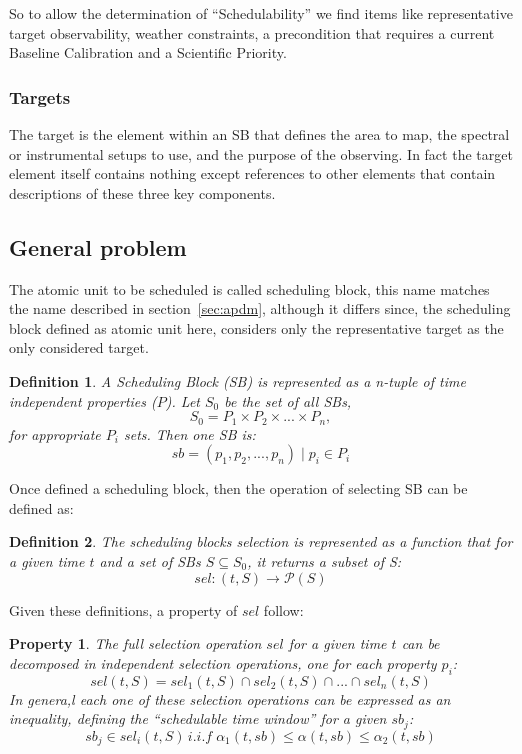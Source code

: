 \documentclass[11pt]{article}
\begin{document}
So to allow the determination of ``Schedulability'' we find items like representative target observability, weather constraints, a precondition that requires a current Baseline Calibration and a Scientific Priority.

\subsubsection*{Targets}
The target is the element within an SB that defines the area to map, the spectral or instrumental setups to use, and the purpose of the observing. In fact the target element itself contains nothing except references to other elements that contain descriptions of these three key components.

\subsection{General problem}
\newtheorem{problem-def}{Definition}
The atomic unit to be scheduled is called scheduling block, this name matches the name described in section~\ref{sec:apdm}, although it differs since, the scheduling block defined as atomic unit here, considers only the representative target as the only considered target.
\begin{problem-def}
A Scheduling Block (SB) is represented as a n-tuple of time independent  properties ($P$). Let $S_0$ be the set of all SBs,
$$S_0 = P_1 \times P_2 \times ... \times P_n,$$
for appropriate $P_i$ sets. Then one SB is:
$$sb = (p_1, p_2, ..., p_n) \mid p_i \in P_i$$
\end{problem-def} 

Once defined a scheduling block, then the operation of selecting SB can be defined as:
\begin{problem-def}
The scheduling blocks selection is represented as a function that for a given time $t$ and a set of SBs $S \subseteq S_0$, it returns a subset of S:
$$sel:(t,S) \rightarrow \mathcal P \left({S}\right)$$
\end{problem-def}

Given these definitions, a property of $sel$ follow:

\newtheorem{sel-props}{Property}
\begin{sel-props}
The full selection operation $sel$ for a given time $t$ can be decomposed in independent selection operations, one for each property $p_i$:
$$sel(t,S) = sel_1(t, S) \cap sel_2(t, S) \cap ... \cap sel_n(t,S)$$
In genera,l each one of these selection operations can be expressed  as an inequality, defining the ``schedulable time window'' for a given $sb_j$:
$$sb_j \in sel_i(t, S)\,i.i.f\;\alpha_1(t, sb) \leq \alpha(t, sb) \leq \alpha_2(t, sb)$$
\end{sel-props}
\end{document}
